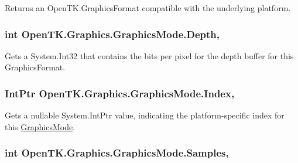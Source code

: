 Returns an Open\-T\-K.\-Graphics\-Format compatible with the underlying platform.

\hypertarget{class_open_t_k_1_1_graphics_1_1_graphics_mode_a03e27f56e7b50e680e42503b51e0c2a8}{
\subsubsection[{Depth}]{\setlength{\rightskip}{0pt plus 5cm}int Open\-T\-K.\-Graphics.\-Graphics\-Mode.\-Depth\hspace{0.3cm}{\ttfamily [get]}, {\ttfamily [set]}}}\label{class_open_t_k_1_1_graphics_1_1_graphics_mode_a03e27f56e7b50e680e42503b51e0c2a8}


Gets a System.\-Int32 that contains the bits per pixel for the depth buffer for this Graphics\-Format. 

\hypertarget{class_open_t_k_1_1_graphics_1_1_graphics_mode_ad3caab1ad7640a5389abc809874fa57e}{
\subsubsection[{Index}]{\setlength{\rightskip}{0pt plus 5cm}Int\-Ptr Open\-T\-K.\-Graphics.\-Graphics\-Mode.\-Index\hspace{0.3cm}{\ttfamily [get]}, {\ttfamily [set]}}}\label{class_open_t_k_1_1_graphics_1_1_graphics_mode_ad3caab1ad7640a5389abc809874fa57e}


Gets a nullable System.\-Int\-Ptr value, indicating the platform-\/specific index for this \hyperlink{class_open_t_k_1_1_graphics_1_1_graphics_mode}{Graphics\-Mode}. 

\hypertarget{class_open_t_k_1_1_graphics_1_1_graphics_mode_a3e7936c43e4aa0c05645bbd5270b5365}{
\subsubsection[{Samples}]{\setlength{\rightskip}{0pt plus 5cm}int Open\-T\-K.\-Graphics.\-Graphics\-Mode.\-Samples\hspace{0.3cm}{\ttfamily [get]}, {\ttfamily [set]}}}\label{class_open_t_k_1_1_graphics_1_1_graphics_mode_a3e7936c43e4aa0c05645bbd5270b5365}


